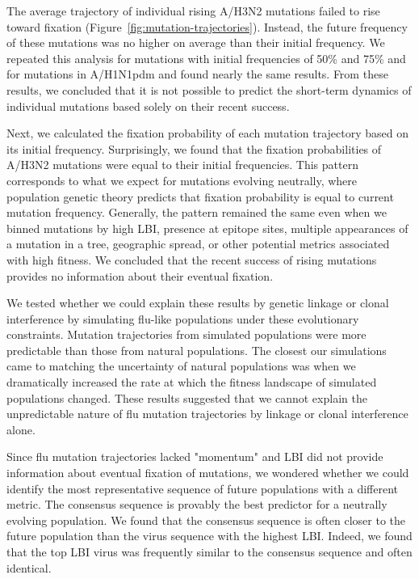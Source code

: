 The average trajectory of individual rising A/H3N2 mutations failed to rise toward fixation (Figure~\ref{fig:mutation-trajectories}).
Instead, the future frequency of these mutations was no higher on average than their initial frequency.
We repeated this analysis for mutations with initial frequencies of 50\% and 75\% and for mutations in A/H1N1pdm and found nearly the same results.
From these results, we concluded that it is not possible to predict the short-term dynamics of individual mutations based solely on their recent success.

Next, we calculated the fixation probability of each mutation trajectory based on its initial frequency.
Surprisingly, we found that the fixation probabilities of A/H3N2 mutations were equal to their initial frequencies.
This pattern corresponds to what we expect for mutations evolving neutrally, where population genetic theory predicts that fixation probability is equal to current mutation frequency.
Generally, the pattern remained the same even when we binned mutations by high LBI, presence at epitope sites, multiple appearances of a mutation in a tree, geographic spread, or other potential metrics associated with high fitness.
We concluded that the recent success of rising mutations provides no information about their eventual fixation.

We tested whether we could explain these results by genetic linkage or clonal interference by simulating flu-like populations under these evolutionary constraints.
Mutation trajectories from simulated populations were more predictable than those from natural populations.
The closest our simulations came to matching the uncertainty of natural populations was when we dramatically increased the rate at which the fitness landscape of simulated populations changed.
These results suggested that we cannot explain the unpredictable nature of flu mutation trajectories by linkage or clonal interference alone.

Since flu mutation trajectories lacked "momentum" and LBI did not provide information about eventual fixation of mutations, we wondered whether we could identify the most representative sequence of future populations with a different metric.
The consensus sequence is provably the best predictor for a neutrally evolving population.
We found that the consensus sequence is often closer to the future population than the virus sequence with the highest LBI.
Indeed, we found that the top LBI virus was frequently similar to the consensus sequence and often identical.

